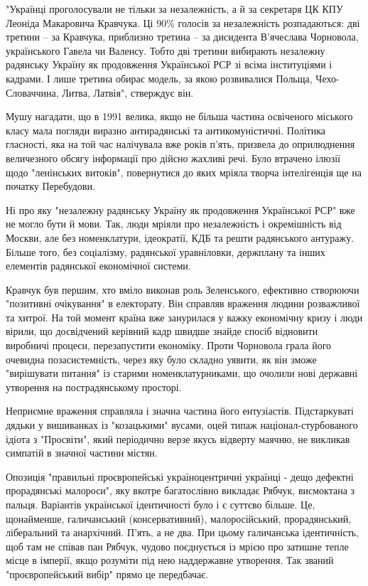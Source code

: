 "Українці проголосували не тільки за незалежність, а й за секретаря ЦК КПУ
Леоніда Макаровича Кравчука. Ці 90\% голосів за незалежність розпадаються: дві
третини – за Кравчука, приблизно третина – за дисидента В’ячеслава Чорновола,
українського Гавела чи Валенсу. Тобто дві третини вибирають незалежну радянську
Україну як продовження Української РСР зі всіма інституціями і кадрами. І лише
третина обирає модель, за якою розвивалися Польща, Чехо-Словаччина, Литва,
Латвія", стверждує він.

Мушу нагадати, що в 1991 велика, якщо не більша частина освіченого міського
класу мала погляди виразно антирадянські та антикомуністичні. Політика
гласності, яка на той час налічувала вже років п'ять, призвела до оприлюднення
величезного обсягу інформації про дійсно жахливі речі. Було втрачено ілюзії
щодо "ленінських витоків", повернутися до яких мріяла творча інтелігенція ще на
початку Перебудови. 

Ні про яку "незалежну радянську Україну як продовження Української РСР" вже не
могло бути й мови. Так, люди мріяли про незалежність і окремішність від Москви,
але без номенклатури, ідеократії, КДБ та решти радянського антуражу. Більше
того, без соціалізму, радянської уравніловки, держплану та інших елементів
радянської економічної системи.  

Кравчук був першим, хто вміло виконав роль Зеленського, ефективно створюючи
"позитивні очікування" в електорату. Він справляв враження людини розважливої
та хитрої. На той момент країна вже занурилася у важку економічну кризу і люди
вірили, що досвідчений керівний кадр швидше знайде спосіб відновити виробничі
процеси, перезапустити економіку. Проти Чорновола грала його очевидна
позасистемність, через яку було складно уявити, як він зможе "вирішувати
питання" із старими номенклатурниками, що очолили нові державні утворення на
пострадянському просторі. 

Неприємне враження справляла і значна частина його ентузіастів. Підстаркуваті
дядьки у вишиванках із "козацькими" вусами, оцей типаж націонал-стурбованого
ідіота з "Просвіти", який періодично верзе якусь відверту маячню, не викликав
симпатій в значної частини містян.

Опозиція "правильні проєвропейські україноцентричні українці - дещо дефектні
прорадянські малороси", яку вкотре багатослівно викладає Рябчук, висмоктана з
пальця. Варіантів української ідентичності було і є суттєво більше. Це,
щонайменше, галичанський (консервативний), малоросійський, прорадянський,
ліберальний та анархічний. П'ять, а не два. При цьому галичанська ідентичність,
щоб там не співав пан Рябчук, чудово поєднується із мрією про затишне тепле
місце в імперії, якщо розуміти під нею наддержавне утворення. Так званий
"проєвропейський вибір" прямо це передбачає.


